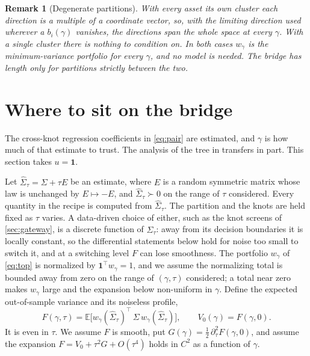\documentclass[11pt]{article}
\newcommand{\ones}{\mathbf{1}}
\newtheorem{remark}{Remark}
\begin{document}
\begin{remark}[Degenerate partitions]
With every asset its own cluster each direction is a multiple of a
coordinate vector, so, with the limiting direction used wherever a
$b_i(\gamma)$ vanishes, the directions span the whole space at every
$\gamma$. With a single cluster
there is nothing to condition on. In both cases $w_\gamma$ is the minimum-variance portfolio for
every $\gamma$, and no model is needed. The bridge has length only for
partitions strictly between the two.
\end{remark}

\section{Where to sit on the bridge}
\label{sec:where}

The cross-knot regression coefficients in \eqref{eq:pair} are estimated, and
$\gamma$ is how much of that estimate to trust. The analysis of the tree in
\cite{cotton2026bridge} transfers in part. This section takes $u=\ones$.

Let $\widehat\Sigma_\tau=\Sigma+\tau E$ be an estimate, where $E$ is a random
symmetric matrix whose law is unchanged by $E\mapsto-E$, and
$\widehat\Sigma_\tau\succ0$ on the range of $\tau$ considered. Every
quantity in the recipe is computed from $\widehat\Sigma_\tau$. The partition
and the knots are held fixed as $\tau$ varies. A data-driven choice of
either, such as the knot screens of \cref{sec:gateway}, is a discrete
function of $\widehat\Sigma_\tau$: away from its decision boundaries it is
locally constant, so the differential statements below hold for noise too
small to switch it, and at a switching level $F$ can lose smoothness. The
portfolio $w_\gamma$ of \eqref{eq:top} is normalized by
$\ones^\top w_\gamma=1$, and we assume the normalizing total is bounded away
from zero on the range of $(\gamma,\tau)$ considered; a total near zero
makes $w_\gamma$ large and the expansion below non-uniform in $\gamma$.
Define the expected
out-of-sample variance and its noiseless profile,
\begin{equation}
  F(\gamma,\tau)=\mathbb{E}\big[w_\gamma(\widehat\Sigma_\tau)^\top\,\Sigma\,
  w_\gamma(\widehat\Sigma_\tau)\big],
  \qquad V_0(\gamma)=F(\gamma,0).
  \label{eq:F}
\end{equation}
It is even in $\tau$. We assume $F$ is smooth, put
$G(\gamma)=\tfrac12\,\partial_\tau^2F(\gamma,0)$, and assume the expansion
$F=V_0+\tau^2G+O(\tau^4)$ holds in $C^2$ as a function of $\gamma$.
\end{document}
